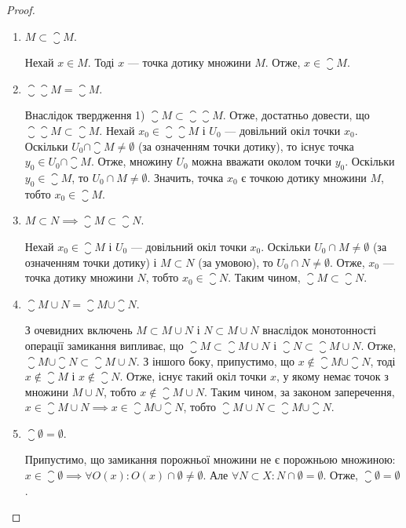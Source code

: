 \begin{proof}
\listhack
\begin{enumerate}
\item $M \subset \closure M$.

Нехай $x \in M$. Тоді $x$ --- точка дотику множини $M$. Отже,
$x \in \closure M$.

\item $\closure{\closure{M}} = \closure M$.

Внаслідок твердження 1) $\closure M \subset \closure{\closure{M}}$. Отже, достатньо
довести, що $\closure{\closure{M}} \subset \closure M$.
Нехай $x_0 \in \closure{\closure{M}}$ і $U_0$ --- довільний окіл
точки $x_0$. Оскільки $U_0 \cap \closure M \ne \emptyset$ (за означенням точки
дотику), то існує точка $y_0 \in U_0 \cap \closure M$. Отже, множину $U_0$
можна вважати околом точки $y_0$. Оскільки $y_0 \in \closure M$, то
$U_0 \cap M \ne \emptyset$. Значить, точка $x_0$ є точкою дотику
множини $M$, тобто $x_0 \in \closure M$.

\item $M \subset N \implies \closure M \subset \closure N$.

Нехай $x_0 \in \closure M$ і $U_0$ --- довільний окіл точки $x_0$. Оскільки
$U_0 \cap M \ne \emptyset$ (за означенням точки дотику) і $M \subset N$ (за
умовою), то $U_0 \cap N \ne \emptyset$. Отже, $x_0$ --- точка дотику
множини $N$, тобто $x_0 \in \closure N$. Таким чином, $\closure M \subset \closure N$.

\item $\closure{M \cup N} = \closure M \cup \closure N$.

З очевидних включень $M \subset M \cup N$ і $N \subset M \cup N$
внаслідок монотонності операції замикання випливає, що
$\closure M \subset \closure{M \cup N}$ і $\closure N \subset \closure{M \cup N}$.
Отже, $\closure M \cup \closure N \subset \closure{M \cup N}$. З іншого
боку, припустимо, що $x \not\in \closure M \cup \closure N$,
тоді $x \not\in \closure M$ і $x \not\in \closure N$. Отже,
існує такий окіл точки $x$, у якому немає точок з множини
$M \cup N$, тобто $x \not\in \closure{M \cup N}$. Таким чином, за законом
заперечення, $x \in \closure{M \cup N} \implies x \in \closure M \cup \closure N$,
тобто $\closure{M \cup N} \subset \closure M \cup \closure N$.

\item $\closure \emptyset = \emptyset$.

Припустимо, що замикання порожньої множини не є
порожньою множиною: $x \in \closure \emptyset \implies \forall O(x): O(x) \cap \emptyset \ne \emptyset$. Але $\forall N \subset X: N \cap \emptyset = \emptyset$. Отже, $\closure \emptyset = \emptyset$. \qedhere
\end{enumerate}
\end{proof}

